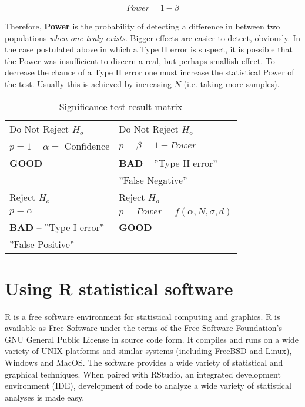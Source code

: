 \begin{center}
\begin{equation}
Power = 1 - \beta
\end{equation} 
\end{center}
 Therefore, \textbf{Power} is the probability of detecting a difference in between two populations \textit{when one truly exists}. Bigger effects are easier to detect, obviously. In the case postulated above in which a Type II error is suspect, it is possible that the Power was insufficient to discern a real, but perhaps smallish effect.  To decrease the chance of a Type II error one must increase the statistical Power of the test.  Usually this is achieved by increasing $N$ (i.e. taking more samples).
\begin{table}[h]\caption{Significance test result matrix}\label{SigTest}
\begin{center}
		{\renewcommand{\arraystretch}{1.8} %
\begin{tabular}{|l|l|}
\hline   Do Not Reject $H_{o}$  &  Do Not Reject $H_{o}$   \\
 $p = 1-\alpha = $ Confidence & $p = \beta = 1-Power$ \\
  \textbf{GOOD} & \textbf{BAD} -- ''Type II error'' \\
  & ''False Negative'' \\
\hline Reject $H_{o}$ & Reject $H_{o}$ \\
 $ p = \alpha$ & $p= Power = f(\alpha, N, \sigma, d)$  \\
 \textbf{BAD} -- ''Type I error''    & \textbf{GOOD} \\
 ''False Positive''  &  \\
\hline 
\end{tabular} }
\end{center}
\end{table}

\section{Using R statistical software}
R is a free software environment for statistical computing and graphics.\cite{Venables2012}\cite{Mohr2018} R is available as Free Software under the terms of the Free Software Foundation’s GNU General Public License in source code form. It compiles and runs on a wide variety of UNIX platforms and similar systems (including FreeBSD and Linux), Windows and MacOS. The software provides a wide variety of statistical and graphical techniques. When paired with RStudio, an integrated development environment (IDE), development of code to analyze a wide variety of statistical analyses is made easy.

